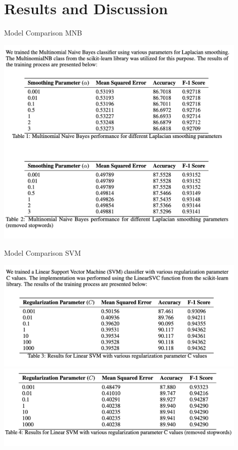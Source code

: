 \documentclass{beamer}
\begin{document}
\section{Results and Discussion}
\begin{frame}{Model Comparison MNB}

\includegraphics[width = 0.9\textwidth]{mb.png}



\end{frame}

\begin{frame}{Model Comparison SVM}

\includegraphics[width = 0.9\textwidth]{svm1.png}
\includegraphics[width = 0.9\textwidth]{svm2.png}


\end{frame}
\end{document}

